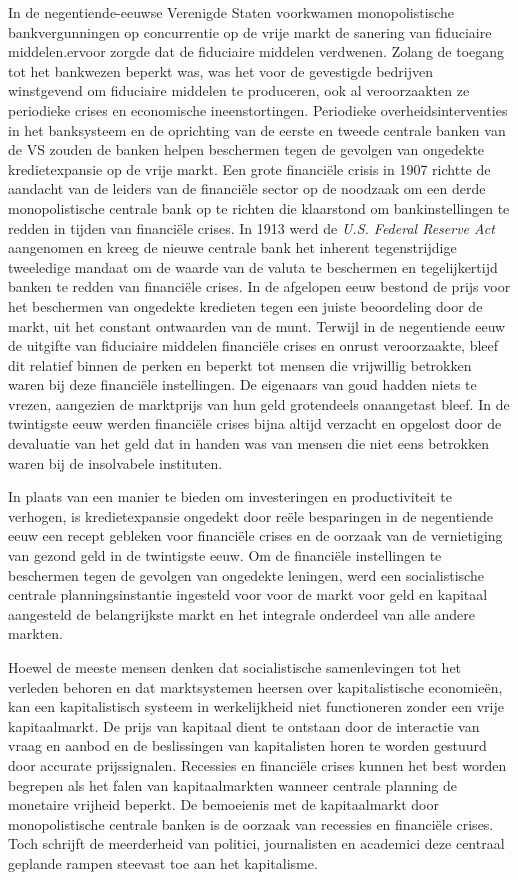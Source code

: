 \documentclass[
  a5paper,
  smalldemyvopaper,11pt,twoside,onecolumn,openright,extrafontsizes,
hidelinks]{memoir}
\begin{document}
In de negentiende-eeuwse Verenigde Staten voorkwamen monopolistische
bankvergunningen op concurrentie op de vrije markt de sanering van
fiduciaire middelen.ervoor zorgde dat de fiduciaire middelen verdwenen.
Zolang de toegang tot het bankwezen beperkt was, was het voor de
gevestigde bedrijven winstgevend om fiduciaire middelen te produceren,
ook al veroorzaakten ze periodieke crises en economische
ineenstortingen. Periodieke overheidsinterventies in het banksysteem en
de oprichting van de eerste en tweede centrale banken van de VS zouden
de banken helpen beschermen tegen de gevolgen van ongedekte
kredietexpansie op de vrije markt. Een grote financiële crisis in 1907
richtte de aandacht van de leiders van de financiële sector op de
noodzaak om een derde monopolistische centrale bank op te richten die
klaarstond om bankinstellingen te redden in tijden van financiële
crises. In 1913 werd de \emph{U.S. Federal Reserve Act} aangenomen en
kreeg de nieuwe centrale bank het inherent tegenstrijdige tweeledige
mandaat om de waarde van de valuta te beschermen en tegelijkertijd
banken te redden van financiële crises. In de afgelopen eeuw bestond de
prijs voor het beschermen van ongedekte kredieten tegen een juiste
beoordeling door de markt, uit het constant ontwaarden van de munt.
Terwijl in de negentiende eeuw de uitgifte van fiduciaire middelen
financiële crises en onrust veroorzaakte, bleef dit relatief binnen de
perken en beperkt tot mensen die vrijwillig betrokken waren bij deze
financiële instellingen. De eigenaars van goud hadden niets te vrezen,
aangezien de marktprijs van hun geld grotendeels onaangetast bleef. In
de twintigste eeuw werden financiële crises bijna altijd verzacht en
opgelost door de devaluatie van het geld dat in handen was van mensen
die niet eens betrokken waren bij de insolvabele instituten.

In plaats van een manier te bieden om investeringen en productiviteit te
verhogen, is kredietexpansie ongedekt door reële besparingen in de
negentiende eeuw een recept gebleken voor financiële crises en de
oorzaak van de vernietiging van gezond geld in de twintigste eeuw. Om de
financiële instellingen te beschermen tegen de gevolgen van ongedekte
leningen, werd een socialistische centrale planningsinstantie ingesteld
voor voor de markt voor geld en kapitaal aangesteld de belangrijkste
markt en het integrale onderdeel van alle andere markten.

Hoewel de meeste mensen denken dat socialistische samenlevingen tot het
verleden behoren en dat marktsystemen heersen over kapitalistische
economieën, kan een kapitalistisch systeem in werkelijkheid niet
functioneren zonder een vrije kapitaalmarkt. De prijs van kapitaal dient
te ontstaan door de interactie van vraag en aanbod en de beslissingen
van kapitalisten horen te worden gestuurd door accurate prijssignalen.
Recessies en financiële crises kunnen het best worden begrepen als het
falen van kapitaalmarkten wanneer centrale planning de monetaire
vrijheid beperkt. De bemoeienis met de kapitaalmarkt door
monopolistische centrale banken is de oorzaak van recessies en
financiële crises. Toch schrijft de meerderheid van politici,
journalisten en academici deze centraal geplande rampen steevast toe aan
het kapitalisme.
\end{document}
